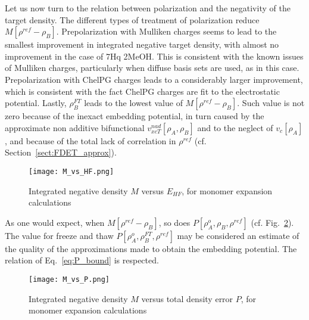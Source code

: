 \documentclass[journal=jctcce,manuscript=article, layout=twocolumn]{achemso}
\begin{document}
Let us now turn to the relation between polarization and the negativity of the target density. The different types of treatment of polarization reduce $M[\rho^{ref} - \rho_B]$. Prepolarization with Mulliken charges seems to lead to the smallest improvement in integrated negative target density, with almost no improvement in the case of 7Hq 2MeOH. This is consistent with the known issues of Mulliken charges, particularly when diffuse basis sets are used, as in this case.
Prepolarization with ChelPG charges leads to a considerably larger improvement, which is consistent with the fact ChelPG charges are fit to the electrostatic potential.
Lastly, $\rho_B^{FT}$ leads to the lowest value of $M[\rho^{ref} - \rho_B]$. Such value is not zero because of the inexact embedding potential, in turn caused by the approximate non additive bifunctional $v_{xcT}^{nad}[\rho_A, \rho_B]$ and to the neglect of $v_c[\rho_A]$, and because of the total lack of correlation in $\rho^{ref}$ (cf. Section~\ref{sect:FDET_approx}).
\begin{figure}[H]
\centering
\texttt{[image: M\_vs\_HF.png]}
\caption{Integrated negative density $M$ versus $E_{HF}$, for monomer expansion calculations}
\label{fig:M_VS_HF}
\end{figure}
 
As one would expect, when $M[\rho^{ref} - \rho_B]$, so does $P[\rho^{o}_A, \rho_B, \rho^{ref}]$ (cf. Fig.~\ref{fig:M_vs_P}). The value for freeze and thaw $P[\rho^{o}_A, \rho_B^{FT}, \rho^{ref}]$ may be considered an estimate of the quality of the approximations made to obtain the embedding potential. The relation of Eq.~\ref{eq:P_bound} is respected.

\begin{figure}[H]
\centering
\texttt{[image: M\_vs\_P.png]}
\caption{Integrated negative density $M$ versus total density error $P$, for monomer expansion calculations}
\label{fig:M_vs_P}
\end{figure}
\end{document}
